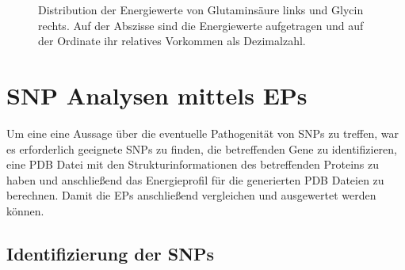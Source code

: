 \begin{figure} 
    \caption{Distribution der Energiewerte von Glutaminsäure links und Glycin rechts. Auf der Abszisse sind die Energiewerte aufgetragen und auf der Ordinate ihr relatives Vorkommen als Dezimalzahl.} 
    \label{fig:ep_as_distr}
\end{figure} 


\newpage
\section{SNP Analysen mittels EPs}
\label{sec:snp_analyse}

Um eine eine Aussage über die eventuelle Pathogenität von \ac{SNP}s zu treffen, war es erforderlich geeignete \ac{SNP}s zu finden, die betreffenden Gene zu identifizieren, eine \ac{PDB} Datei mit den Strukturinformationen des betreffenden Proteins zu haben und anschließend das Energieprofil für die generierten \ac{PDB} Dateien zu berechnen. Damit die \ac{EP}s anschließend vergleichen und ausgewertet werden können.


\subsection{Identifizierung der SNPs}

